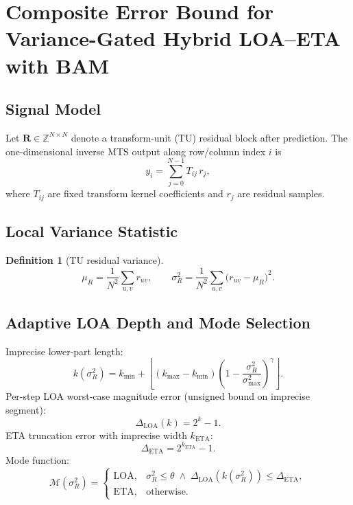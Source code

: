 \documentclass[journal]{IEEEtran}
\newtheorem{definition}{Definition}
\begin{document}
\section{Composite Error Bound for Variance-Gated Hybrid LOA--ETA with BAM}

\subsection{Signal Model}
Let $\mathbf{R}\in\mathbb{Z}^{N\times N}$ denote a transform-unit (TU) residual block after prediction.
The one-dimensional inverse MTS output along row/column index $i$ is
\begin{equation}
  y_i = \sum_{j=0}^{N-1} T_{ij}\, r_j,
  \label{eq:exact_mac}
\end{equation}
where $T_{ij}$ are fixed transform kernel coefficients and $r_j$ are residual samples.

\subsection{Local Variance Statistic}
\begin{definition}[TU residual variance]
\begin{equation}
  \mu_R = \frac{1}{N^2}\sum_{u,v} r_{uv}, \qquad
  \sigma_R^2 = \frac{1}{N^2}\sum_{u,v}\bigl(r_{uv}-\mu_R\bigr)^2.
  \label{eq:variance}
\end{equation}
\end{definition}

\subsection{Adaptive LOA Depth and Mode Selection}
Imprecise lower-part length:
\begin{equation}
  k(\sigma_R^2) = k_{\min} + \left\lfloor (k_{\max}-k_{\min})
  \left(1-\frac{\sigma_R^2}{\sigma_{\max}^2}\right)^{\!\gamma} \right\rfloor.
  \label{eq:k_adapt}
\end{equation}
Per-step LOA worst-case magnitude error (unsigned bound on imprecise segment):
\begin{equation}
  \Delta_{\mathrm{LOA}}(k) = 2^k - 1.
  \label{eq:dloa}
\end{equation}
ETA truncation error with imprecise width $k_{\mathrm{ETA}}$:
\begin{equation}
  \Delta_{\mathrm{ETA}} = 2^{k_{\mathrm{ETA}}} - 1.
  \label{eq:deta}
\end{equation}
Mode function:
\begin{equation}
  \mathcal{M}(\sigma_R^2)=
  \begin{cases}
    \mathrm{LOA}, & \sigma_R^2 \le \theta \;\wedge\; \Delta_{\mathrm{LOA}}(k(\sigma_R^2)) \le \Delta_{\mathrm{ETA}},\\
    \mathrm{ETA}, & \text{otherwise}.
  \end{cases}
  \label{eq:mode}
\end{equation}
\end{document}
